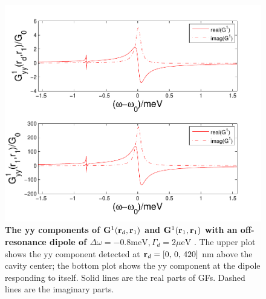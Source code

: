 \begin{figure}[H]
\centering
\begin{center}
\includegraphics[width=14cm]{./Figs/G84_1yy_1}
\end{center}
\caption[yy component of GFT with an off-resonance dipole.]{\textbf{The yy components of $\mathbf{G}^1(\mathbf{r}_d,\mathbf{r}_1)$ and $\mathbf{G}^1(\mathbf{r}_1,\mathbf{r}_1)$  with an off-resonance dipole of $\Delta \omega = -0.8 {\text {meV}}, \Gamma_d = 2 \mu{\text {eV}}$ }. The upper plot shows the yy component detected at $\mathbf{r}_d=[0,\,0,\,420]$ nm above the cavity center; the bottom plot shows the yy component at the dipole responding to itself. Solid lines are the real parts of GFs. Dashed lines are the imaginary parts. }
\label{G84_1yy_1}
\end{figure}


